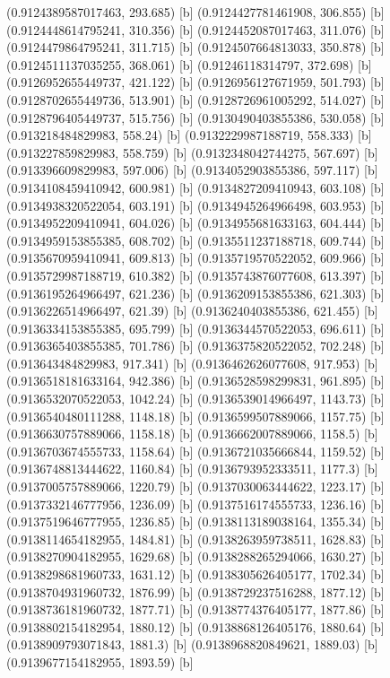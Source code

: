 {{{(0.9124389587017463, 293.685) [b] 
(0.9124427781461908, 306.855) [b] 
(0.9124448614795241, 310.356) [b] 
(0.9124452087017463, 311.076) [b] 
(0.9124479864795241, 311.715) [b] 
(0.9124507664813033, 350.878) [b] 
(0.9124511137035255, 368.061) [b] 
(0.91246118314797, 372.698) [b] 
(0.9126952655449737, 421.122) [b] 
(0.9126956127671959, 501.793) [b] 
(0.9128702655449736, 513.901) [b] 
(0.9128726961005292, 514.027) [b] 
(0.9128796405449737, 515.756) [b] 
(0.9130490403855386, 530.058) [b] 
(0.913218484829983, 558.24) [b] 
(0.9132229987188719, 558.333) [b] 
(0.913227859829983, 558.759) [b] 
(0.9132348042744275, 567.697) [b] 
(0.913396609829983, 597.006) [b] 
(0.9134052903855386, 597.117) [b] 
(0.9134108459410942, 600.981) [b] 
(0.9134827209410943, 603.108) [b] 
(0.9134938320522054, 603.191) [b] 
(0.9134945264966498, 603.953) [b] 
(0.9134952209410941, 604.026) [b] 
(0.9134955681633163, 604.444) [b] 
(0.9134959153855385, 608.702) [b] 
(0.9135511237188718, 609.744) [b] 
(0.9135670959410941, 609.813) [b] 
(0.9135719570522052, 609.966) [b] 
(0.9135729987188719, 610.382) [b] 
(0.9135743876077608, 613.397) [b] 
(0.9136195264966497, 621.236) [b] 
(0.9136209153855386, 621.303) [b] 
(0.9136226514966497, 621.39) [b] 
(0.9136240403855386, 621.455) [b] 
(0.9136334153855385, 695.799) [b] 
(0.9136344570522053, 696.611) [b] 
(0.9136365403855385, 701.786) [b] 
(0.9136375820522052, 702.248) [b] 
(0.913643484829983, 917.341) [b] 
(0.9136462626077608, 917.953) [b] 
(0.9136518181633164, 942.386) [b] 
(0.9136528598299831, 961.895) [b] 
(0.9136532070522053, 1042.24) [b] 
(0.9136539014966497, 1143.73) [b] 
(0.9136540480111288, 1148.18) [b] 
(0.9136599507889066, 1157.75) [b] 
(0.9136630757889066, 1158.18) [b] 
(0.9136662007889066, 1158.5) [b] 
(0.9136703674555733, 1158.64) [b] 
(0.9136721035666844, 1159.52) [b] 
(0.9136748813444622, 1160.84) [b] 
(0.9136793952333511, 1177.3) [b] 
(0.9137005757889066, 1220.79) [b] 
(0.9137030063444622, 1223.17) [b] 
(0.9137332146777956, 1236.09) [b] 
(0.9137516174555733, 1236.16) [b] 
(0.9137519646777955, 1236.85) [b] 
(0.9138113189038164, 1355.34) [b] 
(0.9138114654182955, 1484.81) [b] 
(0.9138263959738511, 1628.83) [b] 
(0.9138270904182955, 1629.68) [b] 
(0.9138288265294066, 1630.27) [b] 
(0.9138298681960733, 1631.12) [b] 
(0.9138305626405177, 1702.34) [b] 
(0.9138704931960732, 1876.99) [b] 
(0.9138729237516288, 1877.12) [b] 
(0.9138736181960732, 1877.71) [b] 
(0.9138774376405177, 1877.86) [b] 
(0.9138802154182954, 1880.12) [b] 
(0.9138868126405176, 1880.64) [b] 
(0.9138909793071843, 1881.3) [b] 
(0.9138968820849621, 1889.03) [b] 
(0.9139677154182955, 1893.59) [b] 
}}}
